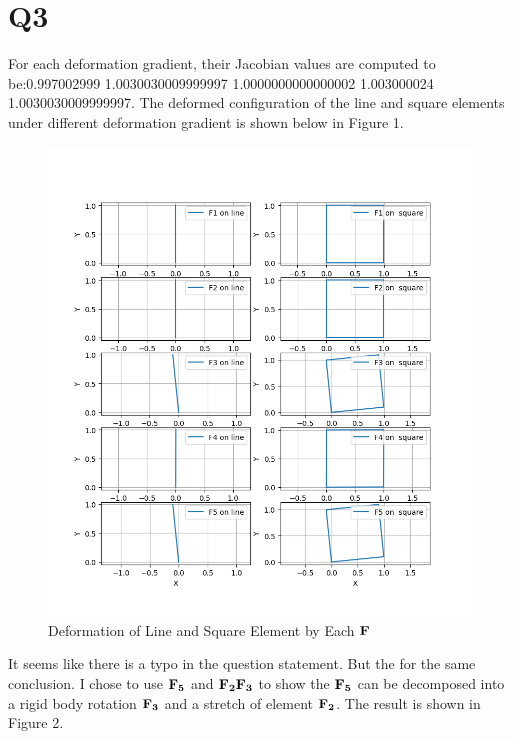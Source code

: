 \documentclass[a4paper,12pt]{article} %
\begin{document}
\newpage
\section*{Q3}
For each deformation gradient, their Jacobian values are computed to be:0.997002999 1.0030030009999997 1.0000000000000002 1.003000024 1.0030030009999997.
The deformed configuration of the line and square elements under different deformation gradient is shown below in Figure 1.
    \begin{figure}[htbp]
        \center
        \includegraphics[scale=0.6]{HW2Q3_1.png}
        \caption{Deformation of Line and Square Element by Each $\mathbf{F}$}
    \end{figure}
It seems like there is a typo in the question statement. But the for the same conclusion.
I chose to use $\mathbf{F_5}$ and $\mathbf{F_2F_3}$ to show the $\mathbf{F_5}$ can be decomposed into a rigid 
body rotation $\mathbf{F_3}$ and a stretch of element $\mathbf{F_2}$. The result is shown in Figure 2.
\end{document}
